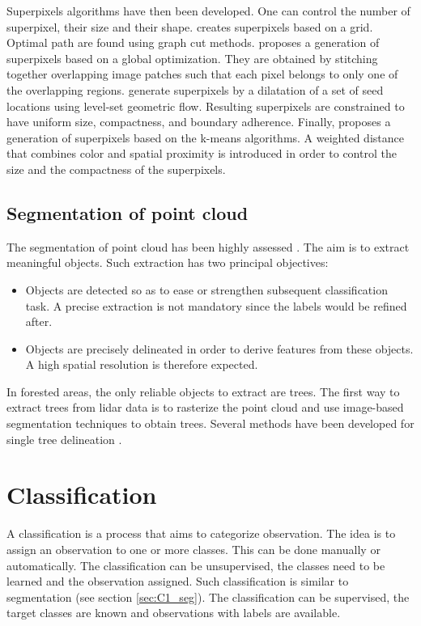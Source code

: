 Superpixels algorithms have then been developed. One can control the number of superpixel, their size and their shape. \cite{moore2008superpixel} creates superpixels based on a grid. Optimal path are found using graph cut methods. \cite{veksler2010superpixels} proposes a generation of superpixels based on a global optimization. They are obtained by stitching together overlapping image patches such that each pixel belongs to only one of the overlapping regions. \cite{levinshtein2009turbopixels} generate superpixels by a dilatation of a set of seed locations using level-set geometric flow. Resulting superpixels are constrained to have uniform size, compactness, and boundary adherence. Finally, \cite{achanta2012slic} proposes a generation of superpixels based on the k-means algorithms. A weighted distance that combines color and spatial proximity is introduced in order to control the size and the compactness of the superpixels.


\subsection{Segmentation of point cloud}
The segmentation of point cloud has been highly assessed \citep{nguyen20133d}. The aim is to extract meaningful objects. Such extraction has two principal objectives:
\begin{itemize}
\item Objects are detected so as to ease or strengthen subsequent classification task. A precise extraction is not mandatory since the labels would be refined after.
\item Objects are precisely delineated in order to derive features from these objects. A high spatial resolution is therefore expected.
\end{itemize}

In forested areas, the only reliable objects to extract are trees. The first way to extract trees from lidar data is to rasterize the point cloud and use image-based segmentation techniques to obtain trees. Several methods have been developed for single tree delineation \citep{dalponte2014tree, vega2014ptrees, kandare2014new}. 

\section{Classification}
A classification is a process that aims to categorize observation. The idea is to assign an observation to one or more classes. This can be done manually or automatically. The classification can be unsupervised, the classes need to be learned and the observation assigned. Such classification is similar to segmentation (see section \ref{sec:C1_seg}). The classification can be supervised, the target classes are known and observations with labels are available.

